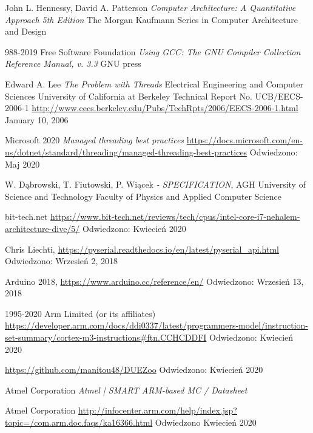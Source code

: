 \documentclass[a4paper,12pt]{article}
\begin{document}
\newpage
\begin{thebibliography}{99}

        John L. Hennessy, David A. Patterson 
        \textit{Computer Architecture: A Quantitative Approach  5th Edition }
        The Morgan Kaufmann Series in Computer Architecture and Design

        988-2019 Free Software Foundation
        \textit{Using GCC: The GNU Compiler Collection Reference Manual, v. 3.3}
        GNU press

        Edward A. Lee
        \textit{The Problem with Threads}
        Electrical Engineering and Computer Sciences
        University of California at Berkeley
        Technical Report No. UCB/EECS-2006-1
        \url{http://www.eecs.berkeley.edu/Pubs/TechRpts/2006/EECS-2006-1.html}
        January 10, 2006

        Microsoft 2020
        \textit{Managed threading best practices}
        \url{https://docs.microsoft.com/en-us/dotnet/standard/threading/managed-threading-best-practices}
        Odwiedzono: Maj 2020
        
	W. Dąbrowski, T. Fiutowski, P. Wiącek 
	\textit{ - SPECIFICATION},
	AGH University of Science and Technology
        Faculty of Physics and Applied Computer Science 

        bit-tech.net
        \url{https://www.bit-tech.net/reviews/tech/cpus/intel-core-i7-nehalem-architecture-dive/5/}
        Odwiedzono:
        Kwiecień 2020

	Chris Liechti,	
	\url{https://pyserial.readthedocs.io/en/latest/pyserial_api.html}
        Odwiedzono: Wrzesień 2, 2018
        
	 Arduino 2018,
	 \url{https://www.arduino.cc/reference/en/}
        Odwiedzono: Wrzesień 13, 2018	 
        
        1995-2020 Arm Limited (or its affiliates)
        \url{https://developer.arm.com/docs/ddi0337/latest/programmers-model/instruction-set-summary/cortex-m3-instructions#ftn.CCHCDDFI}
        Odwiedzono: Kwiecień 2020

        \url{https://github.com/manitou48/DUEZoo}
        Odwiedzono: Kwiecień 2020

        Atmel Corporation
        \textit{Atmel | SMART ARM-based MC  / Datasheet}

        Atmel Corporation
        \url{http://infocenter.arm.com/help/index.jsp?topic=/com.arm.doc.faqs/ka16366.html}
        Odwiedzono Kwiecień 2020

\end{thebibliography}
\end{document}
